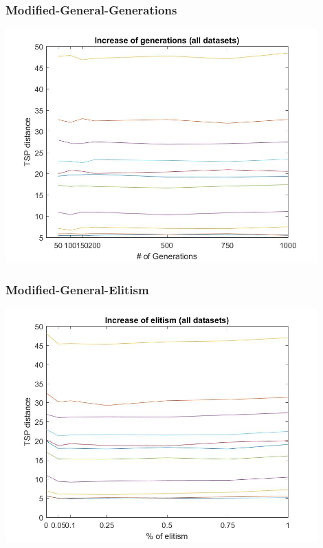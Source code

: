 \subsubsection{Modified-General-Generations}
\begin{center}
\includegraphics[width=12cm]{img/order_crossover/numberGens.jpg}
\end{center}
\subsubsection{Modified-General-Elitism}
\begin{center}
\includegraphics[width=12cm]{img/order_crossover/elitism.jpg}
\end{center}
